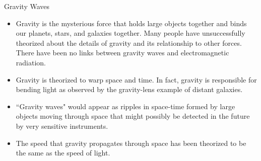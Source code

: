 {\white

{\Large Gravity Waves}

\begin{itemize}

\item Gravity is the mysterious force that holds large objects together and binds our planets, stars, and galaxies together. Many people have unsuccessfully theorized about the details of gravity and its relationship to other forces. There have been no links between gravity waves and electromagnetic radiation.

\item Gravity is theorized to warp space and time. In fact, gravity is responsible for bending light as observed by the gravity-lens example of distant galaxies.

\item ``Gravity waves" would appear as ripples in space-time formed by large objects moving through space that might possibly be detected in the future by very sensitive instruments.

\item The speed that gravity propagates through space has been theorized to be the same as the speed of light.

\end{itemize}
}

